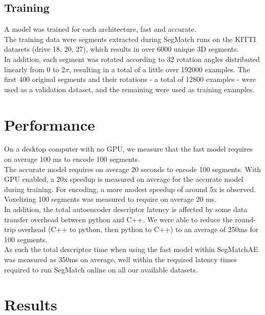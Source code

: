 \subsection{Training}
\label{subsec:ae-training}

A model was trained for each architecture, fast and accurate.\\

The training data were segments extracted during SegMatch runs on the KITTI datasets (drive 18, 20, 27), which results in over 6000 unique 3D segments.\\

In addition, each segment was rotated according to 32 rotation angles distributed linearly from 0 to 2$\pi$, resulting in a total of a little over 192000 examples. The first 400 original segments and their rotations - a total of 12800 examples - were used as a validation dataset, and the remaining were used as training examples.\\

\section{Performance}
\label{sec:ae-performance}

On a desktop computer with no GPU, we measure that the fast model requires on average 100 ms to encode 100 segments.\\

The accurate model requires on average 20 seconds to encode 100 segments. With GPU enabled, a 20x speedup is measured on average for the accurate model during training. For encoding, a more modest speedup of around 5x is observed.\\

Voxelizing 100 segments was measured to require on average 20 ms.\\

In addition, the total autoencoder descriptor latency is affected by some data transfer overhead between python and C++. We were able to reduce the round-trip overhead (C++ to python, then python to C++) to an average of 250ms for 100 segments.\\

As such the total descriptor time when using the fast model within SegMatchAE was measured as 350ms on average, well within the required latency times required to run SegMatch online on all our available datasets.\\

\section{Results}
\label{sec:ae-results}

